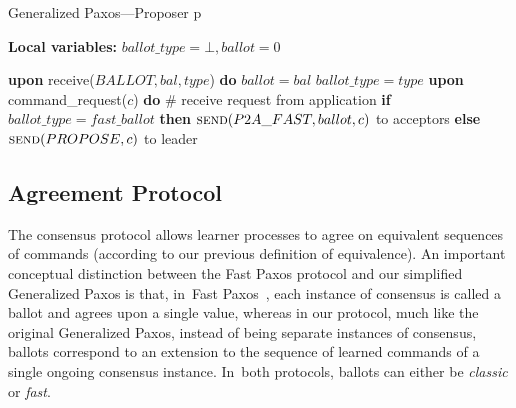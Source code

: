 \documentclass[algorithms,article,accept,moreauthors,pdftex,10pt,a4paper]{Definitions/mdpi}
\begin{document}
\begin{algorithm}[H]
\caption{{Generalized} Paxos{---}Proposer p}
\textbf{Local variables:} $ballot\_type = \bot, ballot = 0$
\begin{algorithmic}[1]
\State \textbf{upon} receive($BALLOT, bal, type$) \textbf{do} 
\State \hspace{\algorithmicindent} 
$ballot = bal$
\State \hspace{\algorithmicindent} 
$ballot\_type = type$
\State
\State \textbf{upon} command\_request($c$) \textbf{do} \hspace{\algorithmicindent}\hspace{\algorithmicindent}\hspace{\algorithmicindent}\# receive request from application
\State \hspace{\algorithmicindent} \textbf{if} $ballot\_type = fast\_ballot$ \textbf{then}
\State \hspace{\algorithmicindent}\hspace{\algorithmicindent} $\Call{send}{P2A\_FAST, ballot, c}$ to acceptors
\State \hspace{\algorithmicindent} \textbf{else} 
\State \hspace{\algorithmicindent}\hspace{\algorithmicindent} $\Call{send}{PROPOSE, c}$ to leader
\end{algorithmic}
\end{algorithm}
\unskip
\subsection{Agreement Protocol}

The consensus protocol allows learner processes to agree on equivalent sequences of commands (according to our previous definition of equivalence).
An important conceptual distinction between the Fast Paxos protocol and our simplified Generalized Paxos is that, in~Fast Paxos~\cite{L06}, each instance of consensus is called a ballot and agrees upon a single value, whereas in our protocol, much like the original Generalized Paxos, instead of being separate instances of consensus, ballots correspond to an extension to the sequence of learned commands of a single ongoing consensus instance. In~both protocols, ballots can either be \textit{classic} or \textit{fast}. 
\end{document}
